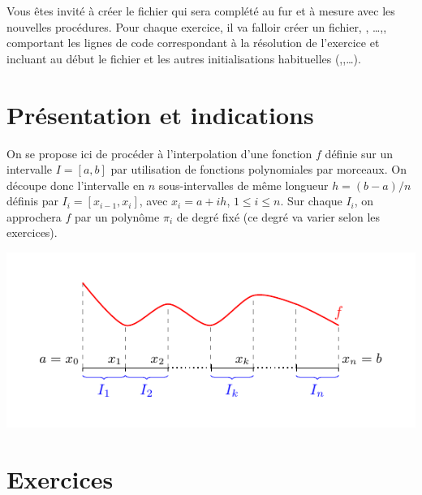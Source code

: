 \documentclass[a4paper,12pt,reqno]{amsart}
\begin{document}

Vous êtes invité à créer le fichier  qui sera complété au fur et à mesure avec les nouvelles procédures. Pour chaque exercice, il va falloir créer un fichier, , \dots ,, comportant les lignes de code correspondant à la résolution de l'exercice et incluant au début le fichier  et les autres initialisations habituelles (,,\dots).\\[1ex]



\section{Présentation et indications}

On se propose ici de procéder à l'interpolation d'une fonction $f$ définie sur un intervalle $I=[a,b]$ par utilisation de fonctions polynomiales par morceaux. On découpe donc l'intervalle en $n$ sous-intervalles de même longueur $h=(b-a)/n$ définis par $I_i=[x_{i-1},x_{i}]$, avec $x_i=a+ih$, $1 \leq i \leq n$. Sur chaque $I_i$, on approchera $f$ par un polynôme $\pi_{i}$ de degré fixé (ce degré va varier selon les exercices).

\begin{center}
  \includegraphics[width=15cm]{FonctionParMorceaux}
\end{center}


\section{Exercices}
\end{document}
